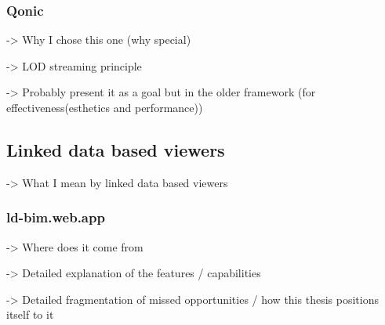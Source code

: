 \subsubsection{Qonic}
-> Why I chose this one (why special)

-> LOD streaming principle

-> Probably present it as a goal but in the older framework (for effectiveness(esthetics and performance))
\subsection{Linked data based viewers}
-> What I mean by linked data based viewers
\subsubsection{ld-bim.web.app}
-> Where does it come from

-> Detailed explanation of the features / capabilities

-> Detailed fragmentation of missed opportunities / how this thesis positions itself to it
